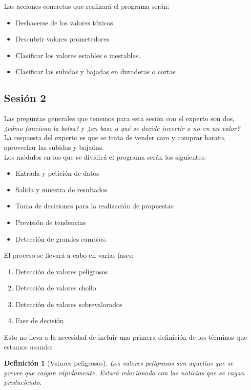\documentclass[11pt,leqno]{article}
\theoremstyle{definition_wo_parentheses}
\newtheorem{definicion}{Definición}[subsection]
\theoremstyle{plain}
\theoremstyle{remark}
\begin{document}
Las acciones concretas que realizará el programa serán:
\begin{itemize}
\item Deshacerse de los valores tóxicos
\item Descubrir valores prometedores
\item Clasificar los valores estables e inestables.
\item Clasificar las subidas y bajadas en duraderas o cortas
\end{itemize}


\subsection{Sesión 2}

	Las preguntas generales que tenemos para esta sesión con el experto son dos, \textit{¿cómo funciona la bolsa?} y \textit{¿en base a qué se decide invertir o no en un valor?} La respuesta del experto es que se trata de vender caro y comprar barato, aprovechar las subidas y bajadas.\\
	
	Los módulos en los que se dividirá el programa serán los siguientes:
	
	\begin{itemize}
		\item Entrada y petición de datos
		\item Salida y muestra de resultados
		\item Toma de decisiones para la realización de propuestas
		\item Previsión de tendencias
		\item Detección de grandes cambios. 
	\end{itemize}

	El proceso se llevará a cabo en varias fases:
	
	\begin{enumerate}
		\item Detección de valores peligrosos
		\item Detección de valores chollo
		\item Detección de valores sobrevalorados
		\item Fase de decisión
	\end{enumerate}
	
	Esto no lleva a la necesidad de incluir una primera definición de los términos que estamos usando:
	
	\begin{definicion}[Valores peligrosos] 
		Los valores peligrosos son aquellos que se prevee que caigan rápidamente. Estará relacionado con las noticias que se vayan produciendo.
	\end{definicion}
\end{document}
